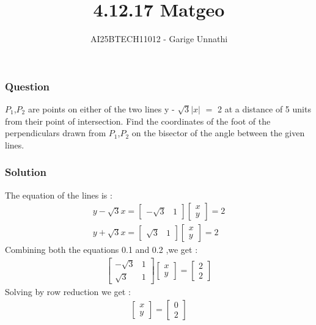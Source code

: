 \documentclass{beamer}
\title{4.12.17 Matgeo}
\author{AI25BTECH11012 - Garige Unnathi}
\date{}
\begin{document}
\frame{\titlepage}

\begin{frame}
\frametitle{Question}
\textbf{$P_1$},\textbf{$P_2$} are points on either of the two lines y - $\sqrt{3}$$\lvert x \rvert$ $=$ 2 at a distance of 5 units from their point of intersection. Find the coordinates of the foot of the perpendiculars drawn from \textbf{$P_1$},\textbf{$P_2$} on the bisector of the angle between the given lines.\\
\end{frame}


\begin{frame}
\frametitle{Solution}
The equation of the lines is :
\begin{align}
  y - \sqrt{3}x = \begin{bmatrix}-\sqrt{3} & 1\end{bmatrix}\begin{bmatrix}x\\y\end{bmatrix} = 2\\
   y + \sqrt{3}x = \begin{bmatrix}\sqrt{3} & 1\end{bmatrix}\begin{bmatrix}x\\y\end{bmatrix} = 2 
\end{align}
Combining both the equations 0.1 and 0.2 ,we get :
\begin{align}
   \begin{bmatrix}-\sqrt{3} & 1\\
           \sqrt{3} & 1 \end{bmatrix}\begin{bmatrix}x\\y\end{bmatrix} = \begin{bmatrix}2\\2\end{bmatrix}
\end{align}
Solving by row reduction we get :
\begin{align}
\begin{bmatrix}x\\y\end{bmatrix} = \begin{bmatrix}0\\2\end{bmatrix}
\end{align}
\end{frame}
\end{document}
